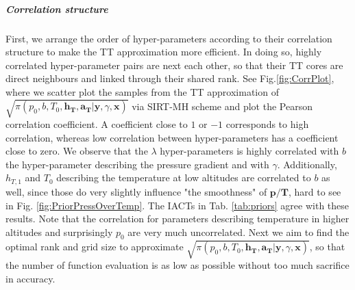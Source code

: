 \subparagraph{Correlation structure}
First, we arrange the order of hyper-parameters according to their correlation structure to make the TT approximation more efficient.
In doing so, highly correlated hyper-parameter pairs are next each other, so that their TT cores are direct neighbours and linked through their shared rank.
See Fig.\ref{fig:CorrPlot}, where we scatter plot the samples from the TT approximation of $\sqrt{\pi(p_0,b,T_0,\bm{h_T},\bm{a_T} | \bm{y}, \gamma, \bm{x})}$ via SIRT-MH scheme and plot the Pearson correlation coefficient.
A coefficient close to $1$ or $-1$ corresponds to high correlation, whereas low correlation between hyper-parameters has a coefficient close to zero.
We observe that the $\lambda$ hyper-parameters is highly correlated with $b$ the hyper-parameter describing the pressure gradient and with $\gamma$.
Additionally, $h_{T,1}$ and $T_0$ describing the temperature at low altitudes are correlated to $b$ as well, since those do very slightly influence "the smoothness" of $\bm{p}/\bm{T}$, hard to see in Fig. \ref{fig:PriorPressOverTemp}.
The IACTs in Tab. \ref{tab:priors} agree with these results.
Note that the correlation for parameters describing temperature in higher altitudes and surprisingly $p_0$ are very much uncorrelated.
Next we aim to find the optimal rank and grid size to approximate $\sqrt{\pi(p_0,b,T_0,\bm{h_T},\bm{a_T} | \bm{y}, \gamma, \bm{x})}$, so that the number of function evaluation is as low as possible without too much sacrifice in accuracy.
